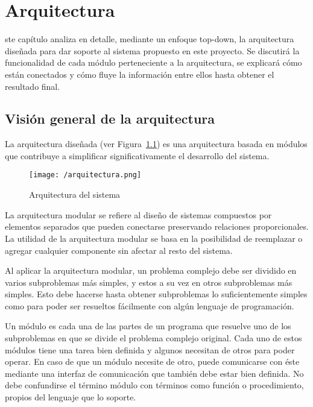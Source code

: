 \chapter{Arquitectura}
\label{chap:arquitectura}

ste capítulo analiza en detalle, mediante un enfoque top-down, la arquitectura diseñada para dar soporte al sistema propuesto en este proyecto. Se discutirá la funcionalidad de cada módulo perteneciente a la arquitectura, se explicará cómo están conectados y cómo fluye la información entre ellos hasta obtener el resultado final. 

\section{Visión general de la arquitectura}
\label{sec:visiongeneral}

La arquitectura diseñada (ver Figura~\ref{fig:arquitectura}) es una arquitectura basada en módulos que contribuye a simplificar significativamente el desarrollo del sistema. \\

\begin{figure}[!h]
\begin{center}
\texttt{[image: /arquitectura.png]}
\caption[Arquitectura del sistema]{Arquitectura del sistema}
\label{fig:arquitectura}
\end{center}
\end{figure}

La arquitectura modular se refiere al diseño de sistemas compuestos por elementos separados que pueden conectarse preservando relaciones proporcionales. La utilidad de la arquitectura modular se basa en la posibilidad de reemplazar o agregar cualquier componente sin afectar al resto del sistema.

Al aplicar la arquitectura modular, un problema complejo debe ser dividido en varios subproblemas más simples, y estos a su vez en otros subproblemas más simples. Esto debe hacerse hasta obtener subproblemas lo suficientemente simples como para poder ser resueltos fácilmente con algún lenguaje de programación.

Un módulo es cada una de las partes de un programa que resuelve uno de los subproblemas en que se divide el problema complejo original. Cada uno de estos módulos tiene una tarea bien definida y algunos necesitan de otros para poder operar. En caso de que un módulo necesite de otro, puede comunicarse con éste mediante una interfaz de comunicación que también debe estar bien definida. No debe confundirse el término módulo con términos como función o procedimiento, propios del lenguaje que lo soporte.


